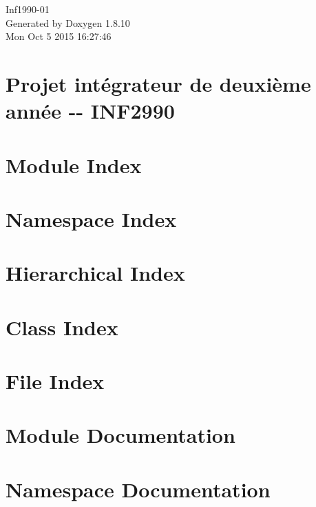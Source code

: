 \documentclass[twoside]{book}
\newcommand{\+}{\discretionary{\mbox{\scriptsize$\hookleftarrow$}}{}{}}
\newcommand{\clearemptydoublepage}{%
  \newpage{\pagestyle{empty}\cleardoublepage}%
}
\begin{document}
\hypersetup{pageanchor=false,
             bookmarks=true,
             bookmarksnumbered=true,
             pdfencoding=unicode
            }
\begin{titlepage}
\vspace*{7cm}
\begin{center}%
{\Large Inf1990-\/01 }\\
\vspace*{1cm}
{\large Generated by Doxygen 1.8.10}\\
\vspace*{0.5cm}
{\small Mon Oct 5 2015 16:27:46}\\
\end{center}
\end{titlepage}
\clearemptydoublepage
\tableofcontents
\clearemptydoublepage
{}
\hypersetup{pageanchor=true}

\chapter{Projet intégrateur de deuxième année -\/-\/ I\+N\+F2990}
\label{index}\hypertarget{index}{}
\chapter{Module Index}

\chapter{Namespace Index}

\chapter{Hierarchical Index}

\chapter{Class Index}

\chapter{File Index}

\chapter{Module Documentation}





\chapter{Namespace Documentation}






\end{document}
